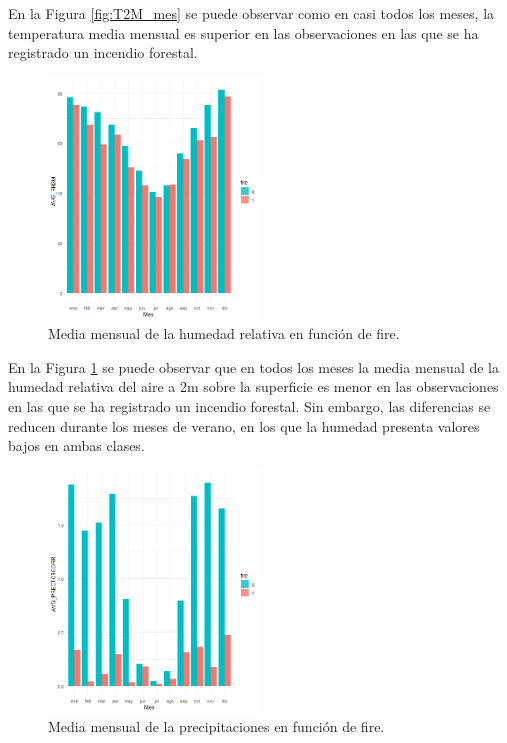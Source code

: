 \documentclass[12pt,a4paper,]{book}
\numberwithin{dummy}{section}
\theoremstyle{ocrenumbox}
\theoremstyle{blacknumex}
\theoremstyle{blacknumbox}
\theoremstyle{ocrenum}
\theoremstyle{ocrenum}
\begin{document}
En la Figura \ref{fig:T2M_mes} se puede observar como en casi todos los
meses, la temperatura media mensual es superior en las observaciones en
las que se ha registrado un incendio forestal.

\begin{figure}[H]
\centering
\includegraphics[width =0.5\textwidth]{graficos/RH2M_mes.png}
\caption{Media mensual de la humedad relativa en función de fire.}
\label{fig:RH2M_mes}
\end{figure}

En la Figura \ref{fig:RH2M_mes} se puede observar que en todos los meses
la media mensual de la humedad relativa del aire a 2m sobre la
superficie es menor en las observaciones en las que se ha registrado un
incendio forestal. Sin embargo, las diferencias se reducen durante los
meses de verano, en los que la humedad presenta valores bajos en ambas
clases.

\begin{figure}[H]
\centering
\includegraphics[width =0.5\textwidth]{graficos/PRECTOTCORR_mes.png}
\caption{Media mensual de la precipitaciones en función de fire.}
\label{fig:PRECTOTCORR_mes}
\end{figure}
\end{document}
